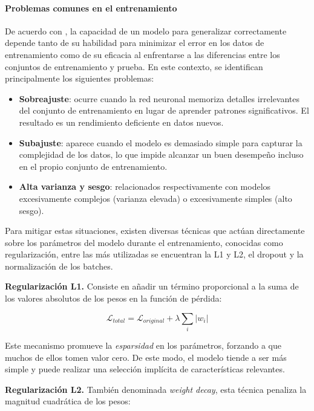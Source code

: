 \paragraph{Problemas comunes en el entrenamiento}
De acuerdo con \citeauthor{dl__goodfellow_2016}, la capacidad de un modelo para generalizar correctamente depende tanto de su habilidad para minimizar el error en los datos de entrenamiento como de su eficacia al enfrentarse a las diferencias entre los conjuntos de entrenamiento y prueba. En este contexto, se identifican principalmente los siguientes problemas:

\begin{itemize}
	\item \textbf{Sobreajuste}: ocurre cuando la red neuronal memoriza detalles irrelevantes del conjunto de entrenamiento en lugar de aprender patrones significativos. El resultado es un rendimiento deficiente en datos nuevos.
	\item \textbf{Subajuste}: aparece cuando el modelo es demasiado simple para capturar la complejidad de los datos, lo que impide alcanzar un buen desempeño incluso en el propio conjunto de entrenamiento.
	\item \textbf{Alta varianza y sesgo}: relacionados respectivamente con modelos excesivamente complejos (varianza elevada) o excesivamente simples (alto sesgo).
\end{itemize}

Para mitigar estas situaciones, existen diversas técnicas que actúan directamente sobre los parámetros del modelo durante el entrenamiento, conocidas como regularización, entre las más utilizadas se encuentran la L1 y L2, el dropout y la normalización de los batches.

\textbf{Regularización L1.} Consiste en añadir un término proporcional a la suma de los valores absolutos de los pesos en la función de pérdida:

\begin{equation}
	\mathcal{L}_{total} = \mathcal{L}_{original} + \lambda \sum_{i} |w_i|
	\label{eq:l1_reg}
\end{equation}

Este mecanismo promueve la \textit{esparsidad} en los parámetros, forzando a que muchos de ellos tomen valor cero. De este modo, el modelo tiende a ser más simple y puede realizar una selección implícita de características relevantes.

\textbf{Regularización L2.} También denominada \textit{weight decay}, esta técnica penaliza la magnitud cuadrática de los pesos:

